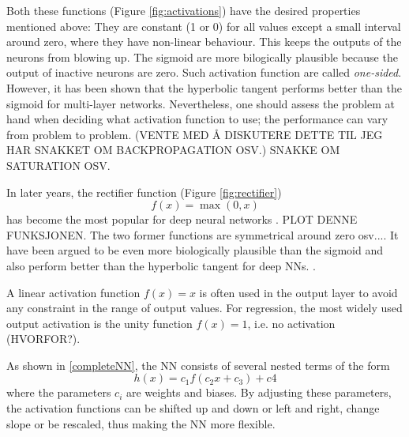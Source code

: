 \documentclass[twoside,english]{uiofysmaster}
\begin{document}
Both these functions (Figure \ref{fig:activations}) have the desired properties mentioned above:
They are constant (1 or 0) for all values except a small interval around zero, where they have non-linear behaviour. 
This keeps the outputs of the neurons from blowing up. The sigmoid are more bilogically plausible because 
the output of inactive neurons are zero. Such activation function are called \textit{one-sided}. However,
it has been shown \cite{Karlik11} that the hyperbolic tangent 
performs better than the sigmoid for multi-layer networks. Nevertheless, one should assess the problem 
at hand when deciding what activation function to use; the performance can vary from problem to problem. 
(VENTE MED Å DISKUTERE DETTE TIL JEG HAR SNAKKET OM BACKPROPAGATION OSV.)
SNAKKE OM SATURATION OSV. 

In later years, the rectifier function (Figure \ref{fig:rectifier})
\begin{equation}
 f(x) = \max(0,x)
\end{equation}
has become the most popular for deep neural networks \cite{LeCun15}. PLOT DENNE FUNKSJONEN.
The two former functions are symmetrical around zero osv....
It have been argued to be even more biologically plausible than the sigmoid and also perform better
than the hyperbolic tangent for deep NNs. \cite{Glorot11}. 


A linear activation function $f(x) = x$ is often used in the output layer to avoid any constraint in the range 
of output values. For regression, the most widely used output activation is the unity function $f(x) = 1$, i.e.
no activation (HVORFOR?).

As shown in \eqref{completeNN}, the NN consists of several nested terms of the form
\begin{equation}
 h(x) = c_1 f(c_2 x + c_3) + c4
\end{equation}
where the parameters $c_i$ are weights and biases. By adjusting these parameters, the activation functions
can be shifted up and down or left and right, change slope or be rescaled, thus making the NN more flexible.
\end{document}
